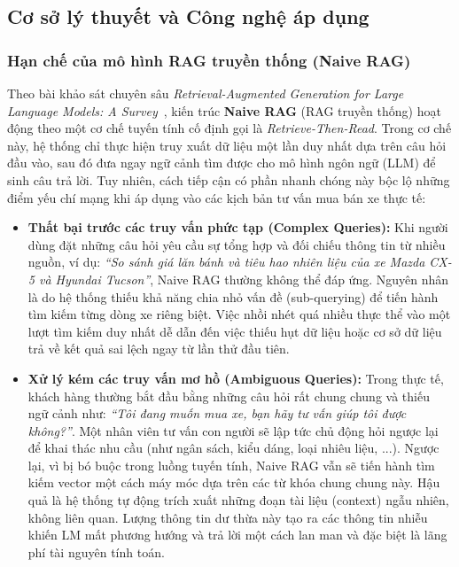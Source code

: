 \subsection{Cơ sở lý thuyết và Công nghệ áp dụng}

\subsubsection{Hạn chế của mô hình RAG truyền thống (Naive RAG)}

Theo bài khảo sát chuyên sâu \textit{Retrieval-Augmented Generation for Large Language Models: A Survey}~\cite{gao2024rag}, kiến trúc \textbf{Naive RAG} (RAG truyền thống) hoạt động theo một cơ chế tuyến tính cố định gọi là \textit{Retrieve-Then-Read}. Trong cơ chế này, hệ thống chỉ thực hiện truy xuất dữ liệu một lần duy nhất dựa trên câu hỏi đầu vào, sau đó đưa ngay ngữ cảnh tìm được cho mô hình ngôn ngữ (LLM) để sinh câu trả lời. Tuy nhiên, cách tiếp cận có phần nhanh chóng này bộc lộ những điểm yếu chí mạng khi áp dụng vào các kịch bản tư vấn mua bán xe thực tế:

\begin{itemize}
    \item \textbf{Thất bại trước các truy vấn phức tạp (Complex Queries):} Khi người dùng đặt những câu hỏi yêu cầu sự tổng hợp và đối chiếu thông tin từ nhiều nguồn, ví dụ: \textit{``So sánh giá lăn bánh và tiêu hao nhiên liệu của xe Mazda CX-5 và Hyundai Tucson''}, Naive RAG thường không thể đáp ứng. Nguyên nhân là do hệ thống thiếu khả năng chia nhỏ vấn đề (sub-querying) để tiến hành tìm kiếm từng dòng xe riêng biệt. Việc nhồi nhét quá nhiều thực thể vào một lượt tìm kiếm duy nhất dễ dẫn đến việc thiếu hụt dữ liệu hoặc cơ sở dữ liệu trả về kết quả sai lệch ngay từ lần thử đầu tiên.
    
    \item \textbf{Xử lý kém các truy vấn mơ hồ (Ambiguous Queries):} Trong thực tế, khách hàng thường bắt đầu bằng những câu hỏi rất chung chung và thiếu ngữ cảnh như: \textit{``Tôi đang muốn mua xe, bạn hãy tư vấn giúp tôi được không?''}. Một nhân viên tư vấn con người sẽ lập tức chủ động hỏi ngược lại để khai thác nhu cầu (như ngân sách, kiểu dáng, loại nhiêu liệu, ...). Ngược lại, vì bị bó buộc trong luồng tuyến tính, Naive RAG vẫn sẽ tiến hành tìm kiếm vector một cách máy móc dựa trên các từ khóa chung chung này. Hậu quả là hệ thống tự động trích xuất những đoạn tài liệu (context) ngẫu nhiên, không liên quan. Lượng thông tin dư thừa này tạo ra các thông tin nhiễu khiến LM mất phương hướng và trả lời một cách lan man và đặc biệt là lãng phí tài nguyên tính toán.
\end{itemize}

